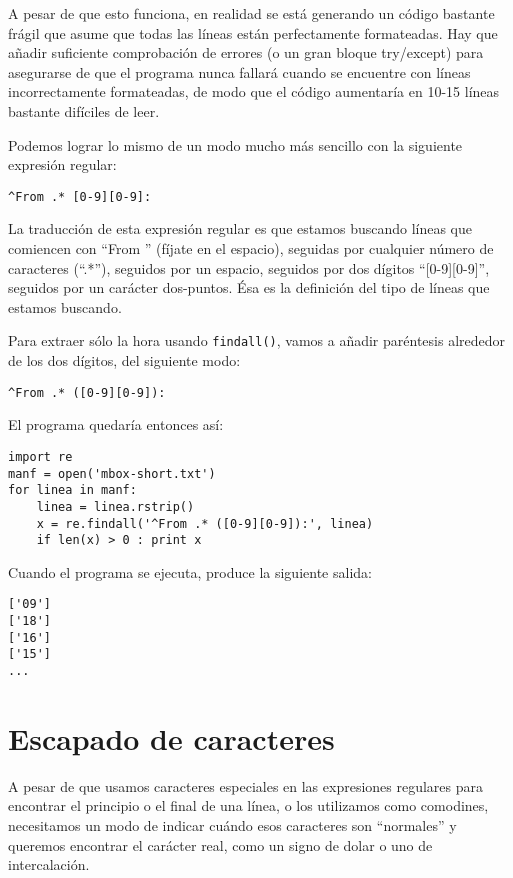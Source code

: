 A pesar de que esto funciona, en realidad se está generando un código bastante frágil que asume que todas las líneas
están perfectamente formateadas. Hay que añadir suficiente comprobación de errores (o un gran bloque try/except)
para asegurarse de que el programa nunca fallará cuando se encuentre con líneas incorrectamente formateadas, de
modo que el código aumentaría en 10-15 líneas bastante difíciles de leer.

Podemos lograr lo mismo de un modo mucho más sencillo con la siguiente expresión regular:

\beforeverb
\begin{verbatim}
^From .* [0-9][0-9]:
\end{verbatim}
\afterverb
%
La traducción de esta expresión regular es que estamos buscando líneas que comiencen con ``From ''
(fíjate en el espacio), seguidas por cualquier número de caracteres (``.*''), seguidos por un espacio,
seguidos por dos dígitos ``[0-9][0-9]'', seguidos por un carácter dos-puntos. Ésa es la definición del tipo de
líneas que estamos buscando.

Para extraer sólo la hora usando {\tt findall()}, vamos a añadir paréntesis alrededor de los dos dígitos,
del siguiente modo:

\beforeverb
\begin{verbatim}
^From .* ([0-9][0-9]):
\end{verbatim}
\afterverb
%
El programa quedaría entonces así:

\beforeverb
\begin{verbatim}
import re
manf = open('mbox-short.txt')
for linea in manf:
    linea = linea.rstrip()
    x = re.findall('^From .* ([0-9][0-9]):', linea)
    if len(x) > 0 : print x
\end{verbatim}
\afterverb
%
Cuando el programa se ejecuta, produce la siguiente salida:

\beforeverb
\begin{verbatim}
['09']
['18']
['16']
['15']
...
\end{verbatim}
\afterverb
%
\section{Escapado de caracteres}

A pesar de que usamos caracteres especiales en las expresiones regulares para encontrar el principio o el final
de una línea, o los utilizamos como comodines, necesitamos un modo de indicar cuándo esos caracteres son
``normales'' y queremos encontrar el carácter real, como un signo de dolar o uno de intercalación.

